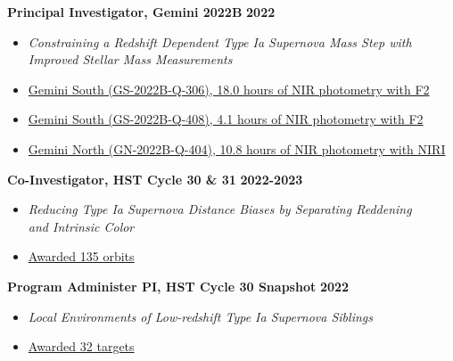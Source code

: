 \documentclass[margin]{res}
\begin{document}
\begin{resume}
\newpage
{\bf Principal Investigator, Gemini 2022B} \hfill \textbf{2022} 
\begin{itemize} \itemsep -2pt %
     \item[] \textit{Constraining a Redshift Dependent Type Ia Supernova Mass Step with \\Improved Stellar Mass Measurements}
     \item[]\href{http://www.gemini.edu/observing/schedules-and-queue/2022b-gs-queue-band-1-3}{Gemini South (GS-2022B-Q-306), 18.0 hours of NIR photometry with F2}
     \item[]\href{http://www.gemini.edu/observing/schedules-and-queue/2022b-gs-queue-band-4}{Gemini South (GS-2022B-Q-408), 4.1 hours of NIR photometry with F2}
     \item[]\href{http://www.gemini.edu/observing/schedules-and-queue/2022b-gn-queue-band-4}{Gemini North (GN-2022B-Q-404), 10.8 hours of NIR photometry with NIRI}
     \end{itemize} \vspace{-12pt}

{\bf Co-Investigator, HST Cycle 30 \& 31} \hfill {\bf 2022-2023}
\begin{itemize} \itemsep -2pt %
     \item[] \textit{Reducing Type Ia Supernova Distance Biases by Separating Reddening\\and Intrinsic Color}
     \item[] \href{https://archive.stsci.edu/proposal_search.php?id=17128&mission=hst}{Awarded 135 orbits}
     \end{itemize} \vspace{-12pt}
     
{\bf Program Administer PI, HST Cycle 30 Snapshot} \hfill {\bf 2022}
\begin{itemize} \itemsep -2pt %
     \item[] \textit{Local Environments of Low-redshift Type Ia Supernova Siblings}
     \item[] \href{https://archive.stsci.edu/proposal_search.php?id=17194&mission=hst}{Awarded 32 targets}
     \end{itemize} \vspace{-12pt}



\end{resume}
\end{document}
